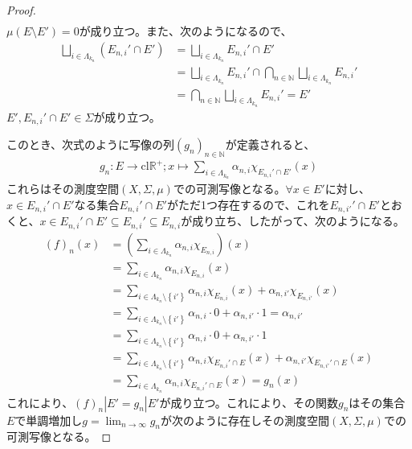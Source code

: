 \documentclass[dvipdfmx]{jsarticle}
\begin{document}
\begin{proof}
\begin{align*}
\end{align*}
$\mu\left( E \setminus E' \right) = 0$が成り立つ。また、次のようになるので、
\begin{align*}
\bigsqcup_{i \in \varLambda_{k_{n}}} \left( E_{n,i}' \cap E' \right) &= \bigsqcup_{i \in \varLambda_{k_{n}}} E_{n,i}' \cap E'\\
&= \bigsqcup_{i \in \varLambda_{k_{n}}} E_{n,i}' \cap \bigcap_{n \in \mathbb{N}} {\bigsqcup_{i \in \varLambda_{k_{n}}} E_{n,i}'}\\
&= \bigcap_{n \in \mathbb{N}} {\bigsqcup_{i \in \varLambda_{k_{n}}} E_{n,i}'} = E'
\end{align*}
$E',E_{n,i}' \cap E' \in \varSigma$が成り立つ。\par
このとき、次式のように写像の列$\left( g_{n} \right)_{n \in \mathbb{N}}$が定義されると、
\begin{align*}
g_{n}:E \rightarrow \mathrm{cl}\mathbb{R}^{+};x \mapsto \sum_{i \in \varLambda_{k_{n}}} {\alpha_{n,i}\chi_{E_{n,i}' \cap E'}(x)}
\end{align*}
これらはその測度空間$(X,\varSigma,\mu)$での可測写像となる。$\forall x \in E'$に対し、$x \in E_{n,i}' \cap E'$なる集合$E_{n,i}' \cap E'$がただ1つ存在するので、これを$E_{n,i'}' \cap E'$とおくと、$x \in E_{n,i}' \cap E' \subseteq E_{n,i}' \subseteq E_{n,i}$が成り立ち、したがって、次のようになる。
\begin{align*}
(f)_{n}(x) &= \left( \sum_{i \in \varLambda_{k_{n}}} {\alpha_{n,i}\chi_{E_{n,i}}} \right)(x)\\
&= \sum_{i \in \varLambda_{k_{n}}} {\alpha_{n,i}\chi_{E_{n,i}}(x)}\\
&= \sum_{i \in \varLambda_{k_{n}} \setminus \left\{ i' \right\}} {\alpha_{n,i}\chi_{E_{n,i}}(x)} + \alpha_{n,i'}\chi_{E_{n,i'}}(x)\\
&= \sum_{i \in \varLambda_{k_{n}} \setminus \left\{ i' \right\}} {\alpha_{n,i} \cdot 0} + \alpha_{n,i'} \cdot 1 = \alpha_{n,i'}\\
&= \sum_{i \in \varLambda_{k_{n}} \setminus \left\{ i' \right\}} {\alpha_{n,i} \cdot 0} + \alpha_{n,i'} \cdot 1\\
&= \sum_{i \in \varLambda_{k_{n}} \setminus \left\{ i' \right\}} {\alpha_{n,i}\chi_{E_{n,i}' \cap E}(x)} + \alpha_{n,i'}\chi_{E_{n,i'}' \cap E}(x)\\
&= \sum_{i \in \varLambda_{k_{n}}} {\alpha_{n,i}\chi_{E_{n,i}' \cap E}(x)} = g_{n}(x)
\end{align*}
これにより、$(f)_{n}\left| E' = g_{n} \right|E'$が成り立つ。これにより、その関数$g_{n}$はその集合$E$で単調増加し$g = \lim_{n \rightarrow \infty}g_{n}$が次のように存在しその測度空間$(X,\varSigma,\mu)$での可測写像となる。

\end{proof}
\end{document}

